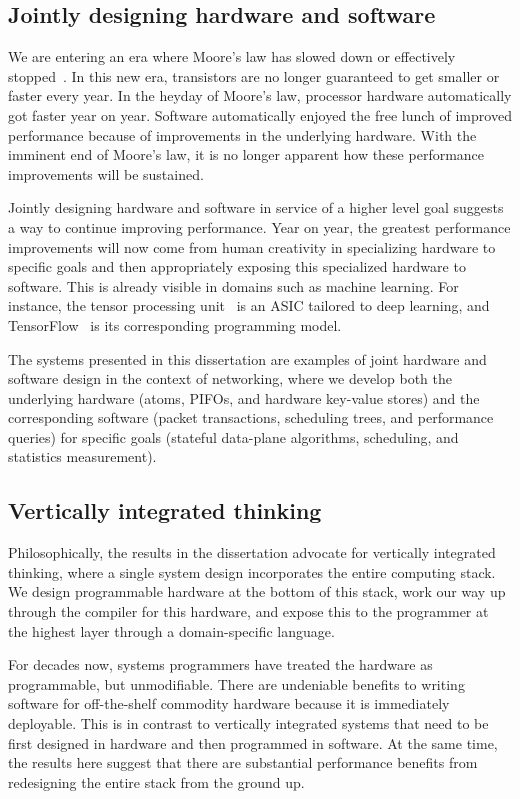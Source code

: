 \subsection{Jointly designing hardware and software} We are entering an era
where Moore's law has slowed down or effectively stopped~\cite{dark_silicon,
four_horsemen}.  In this new era, transistors are no longer guaranteed to get
smaller or faster every year. In the heyday of Moore's law, processor hardware
automatically got faster year on year. Software automatically enjoyed the free
lunch of improved performance because of improvements in the underlying
hardware. With the imminent end of Moore's law, it is no longer apparent how
these performance improvements will be sustained.

Jointly designing hardware and software in service of a higher level goal
suggests a way to continue improving performance. Year on year, the greatest
performance improvements will now come from human creativity in specializing
hardware to specific goals and then appropriately exposing this specialized
hardware to software. This is already visible in domains such as machine
learning. For instance, the tensor processing unit~\cite{tpu} is an ASIC
tailored to deep learning, and TensorFlow~\cite{tensorflow} is its
corresponding programming model.

The systems presented in this dissertation are examples of joint hardware and
software design in the context of networking, where we develop both the
underlying hardware (atoms, PIFOs, and hardware key-value stores) and the
corresponding software (packet transactions, scheduling trees, and performance
queries) for specific goals (stateful data-plane algorithms, scheduling, and
statistics measurement).

\subsection{Vertically integrated thinking} Philosophically, the results in the
dissertation advocate for vertically integrated thinking, where a single system
design incorporates the entire computing stack. We design programmable hardware
at the bottom of this stack, work our way up through the compiler for this
hardware, and expose this to the programmer at the highest layer through a
domain-specific language.

For decades now, systems programmers have treated the hardware as programmable,
but unmodifiable. There are undeniable benefits to writing software for
off-the-shelf commodity hardware because it is immediately deployable. This is
in contrast to vertically integrated systems that need to be first designed in
hardware and then programmed in software. At the same time, the results here
suggest that there are substantial performance benefits from redesigning the
entire stack from the ground up.
